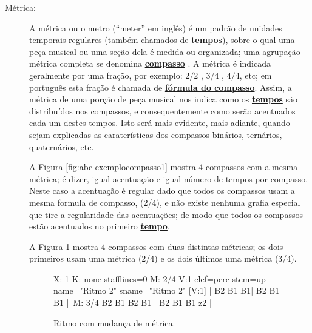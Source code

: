 \begin{description}
\item[Métrica:] \label{def:Metrica} 
A métrica ou o metro  (``meter'' em inglês) é
um padrão de unidades temporais regulares (também chamados de \hyperref[sec:Tempo]{\textbf{tempos}}), 
sobre o qual uma peça musical ou uma seção dela é medida ou organizada;
uma agrupação métrica completa se denomina \hyperref[def:Compasso]{\textbf{compasso}} \cite[pp. 947]{latham2017diccionario} \cite[pp. 523]{apel1969harvard}.
A métrica é indicada geralmente por uma fração, por exemplo:
${2}/{2}$ , ${3}/{4}$ , ${4}/{4}$, etc; 
em português esta fração é chamada de \hyperref[def:FormulaCompasso]{\textbf{fórmula do compasso}}.
Assim, a métrica de uma porção de peça musical nos indica como os \hyperref[sec:Tempo]{\textbf{tempos}} são distribuídos nos compassos,
e consequentemente como serão acentuados cada um destes tempos. Isto será mais evidente, mais adiante, 
quando sejam explicadas as caraterísticas dos compassos binários, ternários, quaternários, etc.
\begin{example}
A Figura \ref{fig:abc-exemplocompasso1} mostra 4 compassos com a mesma métrica;
é dizer, igual acentuação e igual número de tempos por compasso.
Neste caso a acentuação é regular dado que todos os compassos usam a mesma formula de compasso, (2/4), 
e não existe nenhuma grafia especial que tire a regularidade das acentuações;
de modo que todos os compassos estão acentuados no primeiro \hyperref[sec:Tempo]{\textbf{tempo}}.
\end{example}

\begin{example}
A Figura \ref{fig:abc-exemplometrica1} mostra 4 compassos com duas distintas métricas;
os dois primeiros usam uma métrica (2/4) e os dois últimos uma métrica (3/4).
\end{example}

\begin{figure}[h]
\centering
\begin{abc}[name=abc-exemplometrica1]
%
X: 1 %
K: none stafflines=0 %
M: 2/4
V:1 clef=perc stem=up name="Ritmo 2"   sname="Ritmo 2"
%
[V:1] | B2 B1 B1| B2 B1 B1 |\
M: 3/4 
B2 B1 B2 B1 | B2 B1 B1 z2  |
%       
\end{abc}
\caption{Ritmo com mudança de métrica.}
\label{fig:abc-exemplometrica1}
\end{figure}


\end{description}
